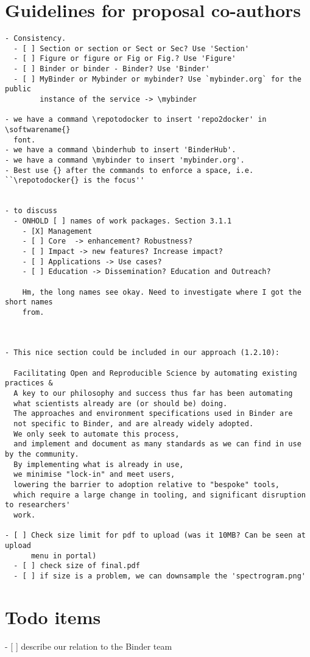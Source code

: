 \documentclass[
  11pt,
  deliverables,
  longtasklabels,
  numericcites,
  noworkareas,
  svgnames,
  \classoptions
]{euproposal}       %
\newcommand{\softwarename}[1]{\texttt{#1}}
\newcommand{\repotodocker}{\softwarename{repo2docker}}
\newcommand{\binderhub}{\softwarename{BinderHub}}
\newcommand{\mybinder}{mybinder.org}   %
\begin{document}
\setlength{\headheight}{13.6pt}

\begin{draft}

\section*{Guidelines for proposal co-authors}

\begin{verbatim}
- Consistency.
  - [ ] Section or section or Sect or Sec? Use 'Section'
  - [ ] Figure or figure or Fig or Fig.? Use 'Figure'
  - [ ] Binder or binder - Binder? Use 'Binder'
  - [ ] MyBinder or Mybinder or mybinder? Use `mybinder.org` for the public
        instance of the service -> \mybinder

- we have a command \repotodocker to insert 'repo2docker' in \softwarename{}
  font.
- we have a command \binderhub to insert 'BinderHub'.
- we have a command \mybinder to insert 'mybinder.org'.
- Best use {} after the commands to enforce a space, i.e. ``\repotodocker{} is the focus''


- to discuss
  - ONHOLD [ ] names of work packages. Section 3.1.1
    - [X] Management
    - [ ] Core  -> enhancement? Robustness?
    - [ ] Impact -> new features? Increase impact?
    - [ ] Applications -> Use cases?
    - [ ] Education -> Dissemination? Education and Outreach?

    Hm, the long names see okay. Need to investigate where I got the short names
    from.



- This nice section could be included in our approach (1.2.10):

  Facilitating Open and Reproducible Science by automating existing practices &
  A key to our philosophy and success thus far has been automating
  what scientists already are (or should be) doing.
  The approaches and environment specifications used in Binder are
  not specific to Binder, and are already widely adopted.
  We only seek to automate this process,
  and implement and document as many standards as we can find in use by the community.
  By implementing what is already in use,
  we minimise "lock-in" and meet users,
  lowering the barrier to adoption relative to "bespoke" tools,
  which require a large change in tooling, and significant disruption to researchers'
  work.

- [ ] Check size limit for pdf to upload (was it 10MB? Can be seen at upload
      menu in portal)
  - [ ] check size of final.pdf
  - [ ] if size is a problem, we can downsample the 'spectrogram.png' 
\end{verbatim}

\section*{Todo items}
- [ ] describe our relation to the Binder team

\end{draft}
\draftpage
\end{document}
